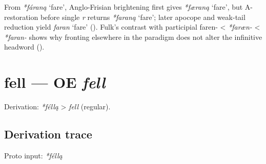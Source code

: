 \documentclass[
  british,
  a4paper,
  openany]{book}
\providecommand{\Recon}[1]{\emph{*#1}}
{\catcode`→=\active \global\def→{\ensuremath{\rightarrow}}}
\providecommand{\texorpdfstring}[2]{#1}
\providecommand{\Recon}[1]{\emph{*#1}}
{\catcode`→=\active \global\def→{\ensuremath{\rightarrow}}}
\begin{document}
From \Recon{fáraną} `fare', Anglo-Frisian brightening first gives
\Recon{færaną} `fare', but A-restoration before single \emph{r} returns
\Recon{faraną} `fare'; later apocope and weak-tail reduction yield
\emph{faran} `fare' ().
Fulk's contrast with participial faren- \textless{} \emph{*faræn-}
\textless{} \emph{*faran-} shows why fronting elsewhere in the paradigm
does not alter the infinitive headword ().

\section{\texorpdfstring{fell --- OE
\emph{fell}}{fell --- OE fell}}\label{fell-oe-fell}


Derivation: \emph{*féllą} \textgreater{} \emph{fell} (regular).

\subsection{Derivation trace}\label{derivation-trace-15}

Proto input: \emph{*féllą}

\begingroup
\setlength{\fboxsep}{6pt}
\end{document}
